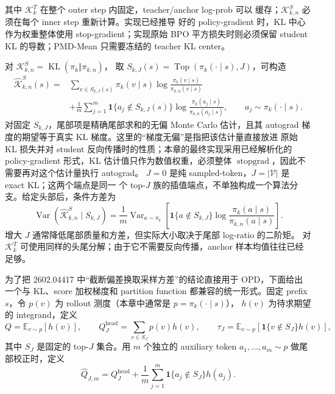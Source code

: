 其中 $\mathcal K_k^{T}$ 在整个 outer step 内固定，teacher/anchor log-prob 可以
缓存；$\mathcal K_{k,n}^{S}$ 必须在每个 inner step 重新计算。实现已经推导
好的 policy-gradient 时，KL 中心作为权重整体使用 stop-gradient；实现原始
BPO 平方损失时则必须保留 student KL 的导数；PMD-Mean 只需要冻结的 teacher KL center。

对 $\mathcal K_{k,n}^{S}=\operatorname{KL}(\pi_k\Vert\pi_{k,n})$，
取 $S_{k,J}(s)=\operatorname{Top}(\pi_k(\cdot\mid s),J)$，可构造
\begin{align}
\widehat{\mathcal K}_{k,n}^{S}(s)
={}&\sum_{v\in S_{k,J}(s)}\pi_k(v\mid s)
\log\frac{\pi_k(v\mid s)}{\pi_{k,n}(v\mid s)}\\
&+\frac1m\sum_{j=1}^{m}\mathbf 1\{a_j\notin S_{k,J}(s)\}
\log\frac{\pi_k(a_j\mid s)}{\pi_{k,n}(a_j\mid s)},
\qquad a_j\sim\pi_k(\cdot\mid s).
\label{eq:ch2-opd-topk-anchor-kl}
\end{align}
对固定 $S_{k,J}$，尾部项是精确尾部求和的无偏 Monte Carlo 估计，且其 autograd
梯度的期望等于真实 KL 梯度。这里的“梯度无偏”是指把该估计量直接放进
原始 KL 损失并对 student 反向传播时的性质；本章的最终实现采用已经解析化的
policy-gradient 形式，KL 估计值只作为数值权重，必须整体
$\operatorname{stopgrad}$，因此不需要再对这个估计量执行 autograd。
$J=0$ 是纯 sampled-token，$J=|\mathcal V|$ 是 exact KL；这两个端点是同一
个 top-$J$ 族的插值端点，不单独构成一个算法分支。给定头部后，条件方差为
\begin{equation}
\operatorname{Var}(\widehat{\mathcal K}_{k,n}^{S}\mid S_{k,J})
=\frac1m\operatorname{Var}_{a\sim\pi_k}\left[
\mathbf 1\{a\notin S_{k,J}\}
\log\frac{\pi_k(a\mid s)}{\pi_{k,n}(a\mid s)}\right].
\end{equation}
增大 $J$ 通常降低尾部质量和方差，但实际大小取决于尾部 log-ratio 的二阶矩。
对 $\mathcal K_k^{T}$ 可使用同样的头尾分解；由于它不需要反向传播，anchor
样本均值往往已经足够。

为了把 2602.04417 中“截断偏差换取采样方差”的结论直接用于 OPD，下面给出
一个与 KL、score 加权梯度和 partition function 都兼容的统一形式。固定 prefix
$s$，令 $p(v)$ 为 rollout 测度（本章中通常是 $p=\pi_k(\cdot\mid s)$），
$h(v)$ 为待求期望的 integrand，定义
\begin{equation}
Q=\mathbb E_{v\sim p}[h(v)],\qquad
Q_J^{\mathrm{head}}=\sum_{v\in S_J}p(v)h(v),\qquad
\tau_J=\mathbb E_{v\sim p}[\mathbf 1\{v\notin S_J\}h(v)],
\label{eq:ch2-opd-generic-tail}
\end{equation}
其中 $S_J$ 是固定的 top-$J$ 集合。用 $m$ 个独立的 auxiliary token
$a_1,\ldots,a_m\sim p$ 做尾部校正时，定义
\begin{equation}
\widehat Q_{J,m}=Q_J^{\mathrm{head}}+
\frac1m\sum_{j=1}^{m}\mathbf 1\{a_j\notin S_J\}h(a_j).
\label{eq:ch2-opd-generic-topk}
\end{equation}

